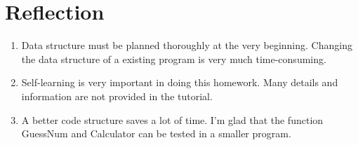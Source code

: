 \documentclass{article}
\begin{document}
\section{Reflection}
\begin{enumerate}
\item Data structure must be planned thoroughly at the very beginning. Changing the data structure of a existing
program is very much time-consuming.
\item Self-learning is very important in doing this homework. Many details and information are not provided in the tutorial.
\item A better code structure saves a lot of time. I'm glad that the function {\cs GuessNum} and {\cs Calculator} can
be tested in a smaller program.
\end{enumerate}
\end{document}
